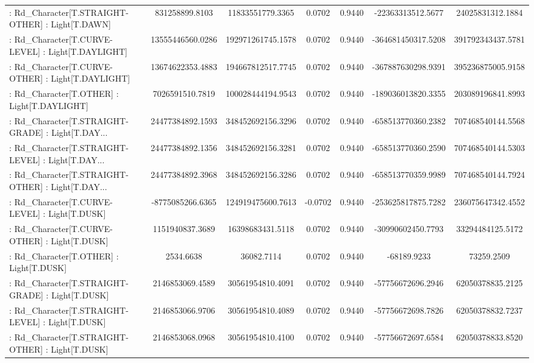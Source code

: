 \begin{longtable}{p{4cm}cccccc}
 : Rd\_Character[T.STRAIGHT-OTHER] : Light[T.DAWN]  &    831258899.8103 &  11833551779.3365 &  0.0702 &       0.9440 &  -22363313512.5677 &  24025831312.1884 \\
 : Rd\_Character[T.CURVE-LEVEL] : Light[T.DAYLIGHT] &  13555446560.0286 & 192971261745.1578 &  0.0702 &       0.9440 & -364681450317.5208 & 391792343437.5781 \\
 : Rd\_Character[T.CURVE-OTHER] : Light[T.DAYLIGHT] &  13674622353.4883 & 194667812517.7745 &  0.0702 &       0.9440 & -367887630298.9391 & 395236875005.9158 \\
 : Rd\_Character[T.OTHER] : Light[T.DAYLIGHT]       &   7026591510.7819 & 100028444194.9543 &  0.0702 &       0.9440 & -189036013820.3355 & 203089196841.8993 \\
 : Rd\_Character[T.STRAIGHT-GRADE] : Light[T.DAY... &  24477384892.1593 & 348452692156.3296 &  0.0702 &       0.9440 & -658513770360.2382 & 707468540144.5568 \\
 : Rd\_Character[T.STRAIGHT-LEVEL] : Light[T.DAY... &  24477384892.1356 & 348452692156.3281 &  0.0702 &       0.9440 & -658513770360.2590 & 707468540144.5303 \\
 : Rd\_Character[T.STRAIGHT-OTHER] : Light[T.DAY... &  24477384892.3968 & 348452692156.3286 &  0.0702 &       0.9440 & -658513770359.9989 & 707468540144.7924 \\
 : Rd\_Character[T.CURVE-LEVEL] : Light[T.DUSK]     &  -8775085266.6365 & 124919475600.7613 & -0.0702 &       0.9440 & -253625817875.7282 & 236075647342.4552 \\
 : Rd\_Character[T.CURVE-OTHER] : Light[T.DUSK]     &   1151940837.3689 &  16398683431.5118 &  0.0702 &       0.9440 &  -30990602450.7793 &  33294484125.5172 \\
 : Rd\_Character[T.OTHER] : Light[T.DUSK]           &         2534.6638 &        36082.7114 &  0.0702 &       0.9440 &        -68189.9233 &        73259.2509 \\
 : Rd\_Character[T.STRAIGHT-GRADE] : Light[T.DUSK]  &   2146853069.4589 &  30561954810.4091 &  0.0702 &       0.9440 &  -57756672696.2946 &  62050378835.2125 \\
 : Rd\_Character[T.STRAIGHT-LEVEL] : Light[T.DUSK]  &   2146853066.9706 &  30561954810.4089 &  0.0702 &       0.9440 &  -57756672698.7826 &  62050378832.7237 \\
 : Rd\_Character[T.STRAIGHT-OTHER] : Light[T.DUSK]  &   2146853068.0968 &  30561954810.4100 &  0.0702 &       0.9440 &  -57756672697.6584 &  62050378833.8520 \\

\end{longtable}
